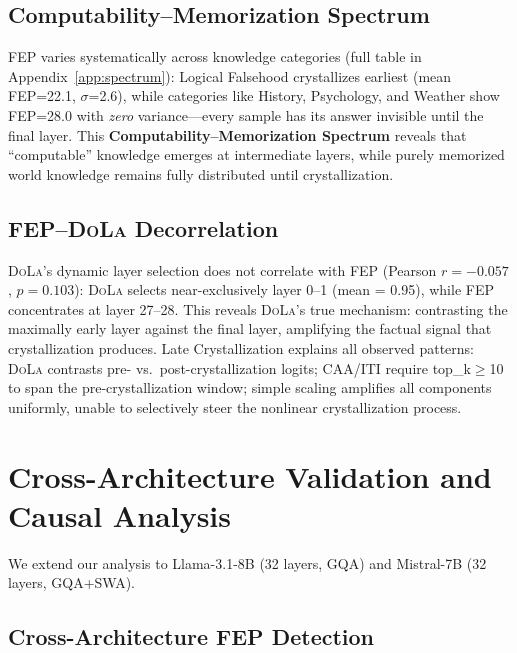 \documentclass{article}
\newcommand{\iti}{\textsc{ITI}}
\newcommand{\dola}{\textsc{DoLa}}
\newcommand{\caa}{\textsc{CAA}}
\begin{document}
\subsection{Computability--Memorization Spectrum}
\label{sec:spectrum}

FEP varies systematically across knowledge categories (full table in Appendix~\ref{app:spectrum}): Logical Falsehood crystallizes earliest (mean FEP=22.1, $\sigma$=2.6), while categories like History, Psychology, and Weather show FEP=28.0 with \emph{zero} variance---every sample has its answer invisible until the final layer. This \textbf{Computability--Memorization Spectrum} reveals that ``computable'' knowledge emerges at intermediate layers, while purely memorized world knowledge remains fully distributed until crystallization.

\subsection{FEP--\dola{} Decorrelation}
\label{sec:fep_dola}

\dola{}'s dynamic layer selection does not correlate with FEP (Pearson $r = -0.057$, $p = 0.103$): \dola{} selects near-exclusively layer 0--1 (mean = 0.95), while FEP concentrates at layer 27--28. This reveals \dola{}'s true mechanism: contrasting the maximally early layer against the final layer, amplifying the factual signal that crystallization produces. Late Crystallization explains all observed patterns: \dola{} contrasts pre- vs.\ post-crystallization logits; \caa{}/\iti{} require top\_k$\geq$10 to span the pre-crystallization window; simple scaling amplifies all components uniformly, unable to selectively steer the nonlinear crystallization process.

\section{Cross-Architecture Validation and Causal Analysis}
\label{sec:cross_arch}

We extend our analysis to Llama-3.1-8B (32 layers, GQA) and Mistral-7B (32 layers, GQA+SWA).

\subsection{Cross-Architecture FEP Detection}
\end{document}
